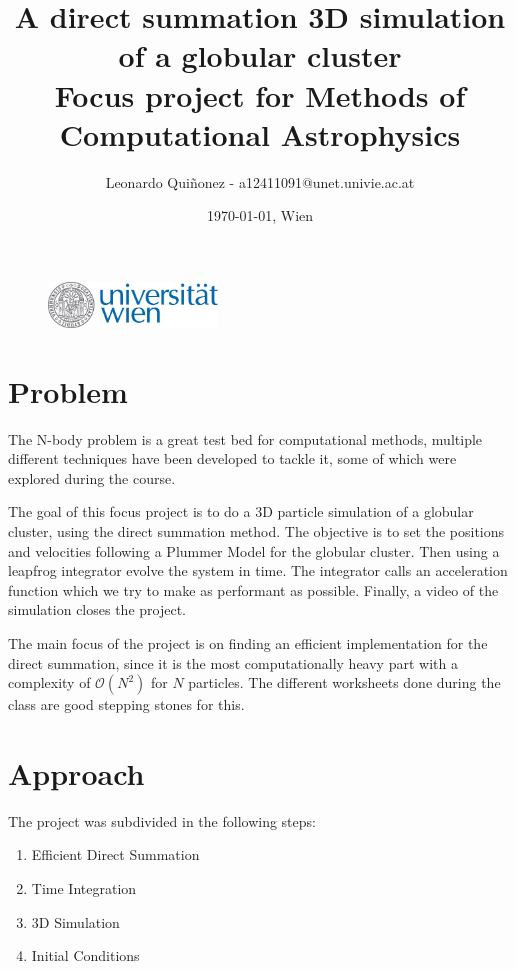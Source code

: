 \documentclass[a4paper, 11pt]{article}         %
\makeatletter
\newcommand{\titlefirstpage}{A direct summation 3D simulation of a globular cluster}
\newcommand{\authorname}{Leonardo Quiñonez}
\newcommand{\authormail}{a12411091@unet.univie.ac.at}
\newcommand{\authordate}{\today{}}
\newcommand{\authorplace}{Wien}
\makeatother
\begin{document}
\begin{figure}                                  %
\flushleft
\includegraphics[width=0.4\textwidth]{univienna-logo.eps}
\end{figure}

\title{\titlefirstpage{} \\ \large Focus project for Methods of Computational Astrophysics}

\author{\authorname{} - \authormail{}}
\date{\authordate, \authorplace}

\maketitle                                      %

\section{Problem}                              %

The N-body problem is a great test bed for computational methods,
multiple different techniques have been developed to tackle it, some of which were explored during the course. \parencite{Hahn2025classnotes}

The goal of this focus project is to do a 3D particle simulation  of a globular cluster, using the direct summation method. 
The objective is to set the positions and velocities following a Plummer Model for the globular cluster. Then using a leapfrog integrator evolve the system in time. The integrator calls an acceleration function which we try to make as performant as possible. Finally, a video of the simulation closes the project.

The main focus of the project is on finding an efficient implementation for the direct summation,
since it is the most computationally heavy part with a complexity of \( \mathcal{O}(N^2) \) for \( N \) particles. The different worksheets done during the class are good stepping stones for this.



\section{Approach}                              %
The project was subdivided in the following steps:
\begin{enumerate}
    \item Efficient Direct Summation
    \item Time Integration
    \item 3D Simulation
    \item Initial Conditions
\end{enumerate}
\end{document}
